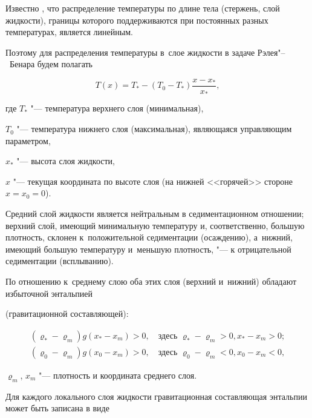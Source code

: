 \indent 



Известно \cite{lukashev:bib47}, что распределение температуры по длине тела (стержень, слой жидкости), границы которого поддерживаются при постоянных разных температурах, является линейным. 

Поэтому для распределения температуры в~слое жидкости в задаче Рэлея"--~Бенара будем полагать

\begin{equation}

T(x)=T_* - (T_0-T_*) \frac{x-x_*}{x_*}, \label{lukashev:N3}

\end{equation}

где  $T_*$ "--- температура верхнего слоя (минимальная), 

$T_0$ "--- температура нижнего слоя (максимальная), являющаяся управляющим параметром,  

$x_*$ "--- высота слоя жидкости,  

$x$ "--- текущая координата по высоте слоя (на нижней <<горячей>> стороне $x=x_0=0$).



Средний слой жидкости является нейтральным в седиментационном отношении; верхний слой, имеющий минимальную температуру и, соответственно, большую плотность, склонен к~положительной седиментации (осаждению), а~нижний, имеющий большую температуру и~меньшую плотность, "--- к отрицательной седиментации (всплыванию). 

По отношению к~среднему слою оба этих слоя (верхний и~нижний) обладают избыточной энтальпией 

(гравитационной составляющей):

\begin{gather}

(\varrho_*-\varrho_m ) g (x_*-x_m)>0, \quad \text{здесь~} \varrho_*-\varrho_m >0, x_*-x_m>0;

\label{lukashev:N4}\\

(\varrho_0-\varrho_m ) g(x_0-x_m)>0, \quad \text{здесь~} \varrho_0-\varrho_m <0, x_0-x_m<0,

\end{gather}

$\varrho_m$, $x_m$ "--- плотность и координата среднего слоя.



Для каждого локального слоя жидкости гравитационная составляющая энтальпии может быть записана в виде

